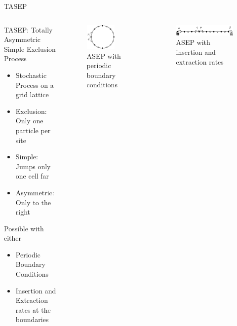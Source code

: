 \documentclass[10pt,xcolor=table, aspectratio=1610]{beamer}
\begin{document}
\begin{frame}{TASEP}
    \begin{columns}
      \begin{block}{TASEP: Totally Asymmetric Simple Exclusion Process}
      \begin{itemize}
        \item Stochastic Process on a grid lattice
        \item Exclusion: Only one particle per site
        \item Simple: Jumps only one cell far 
        \item Asymmetric: Only to the right
      \end{itemize}
      Possible with either
      \begin{itemize}
        \item Periodic Boundary Conditions
        \item Insertion and Extraction rates at the boundaries
      \end{itemize}
      \end{block}
      \begin{figure}
        \includegraphics[width=0.7\textwidth]{../Thesis/img/model/out/tasep_a.pdf}
        \caption*{ASEP with periodic boundary conditions}
      \end{figure}
      \begin{figure}
        \includegraphics[width=\textwidth]{../Thesis/img/model/out/tasep_b.pdf}
        \caption*{ASEP with insertion and extraction rates}
      \end{figure}
    \end{columns}
\end{frame}
\end{document}
